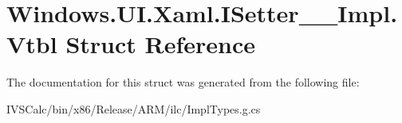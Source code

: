 \hypertarget{struct_windows_1_1_u_i_1_1_xaml_1_1_i_setter_____impl_1_1_vtbl}{}\section{Windows.\+U\+I.\+Xaml.\+I\+Setter\+\_\+\+\_\+\+Impl.\+Vtbl Struct Reference}
\label{struct_windows_1_1_u_i_1_1_xaml_1_1_i_setter_____impl_1_1_vtbl}


The documentation for this struct was generated from the following file\+:\begin{DoxyCompactItemize}
\item 
I\+V\+S\+Calc/bin/x86/\+Release/\+A\+R\+M/ilc/Impl\+Types.\+g.\+cs\end{DoxyCompactItemize}
